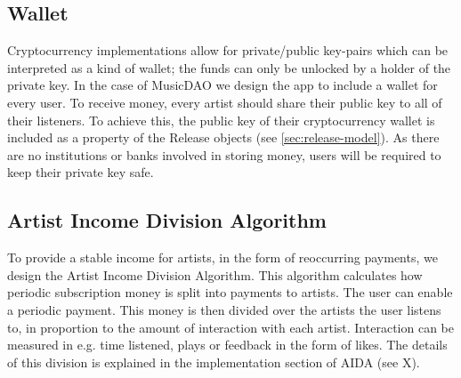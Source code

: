 \subsection{Wallet}
Cryptocurrency implementations allow for private/public key-pairs which can be interpreted as a kind of wallet; the funds can only be unlocked by a holder of the private key. In the case of MusicDAO we design the app to include a wallet for every user. To receive money, every artist should share their public key to all of their listeners. To achieve this, the public key of their cryptocurrency wallet is included as a property of the Release objects (see \ref{sec:release-model}). As there are no institutions or banks involved in storing money, users will be required to keep their private key safe.

\subsection{Artist Income Division Algorithm}
\label{sec:aida-design}
To provide a stable income for artists, in the form of reoccurring payments, we design the Artist Income Division Algorithm. This algorithm calculates how periodic subscription money is split into payments to artists. The user can enable a periodic payment. This money is then divided over the artists the user listens to, in proportion to the amount of interaction with each artist. Interaction can be measured in e.g. time listened, plays or feedback in the form of likes. The details of this division is explained in the implementation section of AIDA (see X).
